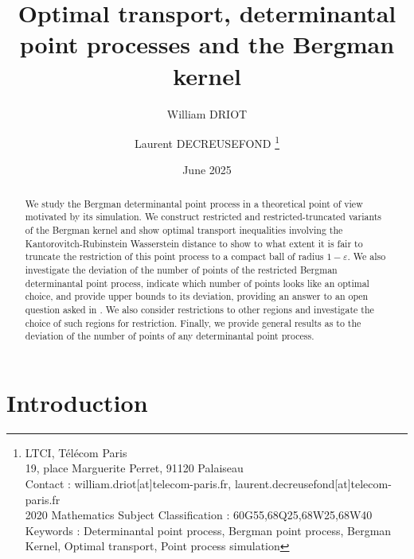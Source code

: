 \documentclass[11pt]{article}
\title{\textbf{Optimal transport, determinantal point processes and the Bergman kernel}}
\author{William DRIOT \and Laurent DECREUSEFOND \thanks{LTCI, Télécom Paris \\ 19, place Marguerite Perret, 91120 Palaiseau \\ Contact : william.driot[at]telecom-paris.fr, laurent.decreusefond[at]telecom-paris.fr \\ 2020 Mathematics Subject Classification : 60G55,68Q25,68W25,68W40 \\ Keywords : Determinantal point process, Bergman point process, Bergman Kernel, Optimal transport, Point process simulation}}
\date{June 2025}
\begin{document}
\maketitle


\begin{abstract}
    We study the Bergman determinantal point process in a theoretical point of view motivated by its simulation. We construct restricted and restricted-truncated variants of the Bergman kernel and show optimal transport inequalities involving the Kantorovitch-Rubinstein Wasserstein distance to show to what extent it is fair to truncate the restriction of this point process to a compact ball of radius $1 - \varepsilon $. We also investigate the deviation of the number of points of the restricted Bergman determinantal point process, indicate which number of points looks like an optimal choice, and provide upper bounds to its deviation, providing an answer to an open question asked in \cite{Decreusefond2016}. We also consider restrictions to other regions and investigate the choice of such regions for restriction. Finally, we provide general results as to the deviation of the number of points of any determinantal point process.
\end{abstract}

\tableofcontents

\setlength{\parindent}{15pt} %
\setlength{\parskip}{6pt}    %

\section{Introduction}
\end{document}
